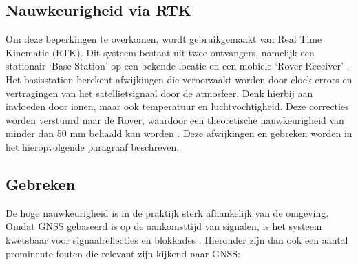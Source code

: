 \subsection{Nauwkeurigheid via RTK}
Om deze beperkingen te overkomen, wordt gebruikgemaakt van Real Time Kinematic (RTK). Dit systeem bestaat uit twee ontvangers, namelijk een stationair `Base Station' op een bekende locatie en een mobiele `Rover Receiver' \cite{gpsgeometer_rtk}. Het basisstation berekent afwijkingen die veroorzaakt worden door clock errors en vertragingen van het satellietsignaal door de atmosfeer. Denk hierbij aan invloeden door ionen, maar ook temperatuur en luchtvochtigheid. Deze correcties worden verstuurd naar de Rover, waardoor een theoretische nauwkeurigheid van minder dan 50 mm behaald kan worden \cite{valente2020accuracy}. Deze afwijkingen en gebreken worden in het hieropvolgende paragraaf beschreven.


\subsection{Gebreken}
De hoge nauwkeurigheid is in de praktijk sterk afhankelijk van de omgeving. Omdat GNSS gebaseerd is op de aankomsttijd van signalen, is het systeem kwetsbaar voor signaalreflecties en blokkades \cite{NovAtelMultipath2026}. Hieronder zijn dan ook een aantal prominente fouten die relevant zijn kijkend naar GNSS:

